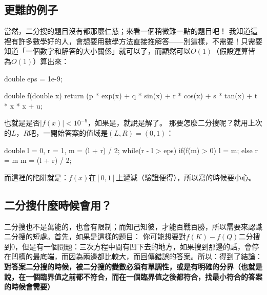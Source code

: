 	\subsection{更難的例子}
		當然，二分搜的題目沒有都那麼仁慈；來看一個稍微難一點的題目吧！
		我知道這裡有許多數學好的人，會想要用數學方法直接推解答——別這樣，不需要！只需要知道「一個數字和解答的大小關係」就可以了，而顯然可以$O(1)$（假設運算皆為$O(1)$）算出來：
		\begin{C++}
double eps = 1e-9;

double f(double x){
	return (p * exp(x) + q * sin(x) + r * cos(x) + s * tan(x) + t * x * x + u;	
}
		\end{C++}
		也就是是否$|f(x)| < 10^{-9}$，如果是，就說是解了。
		那要怎麼二分搜呢？就用上次的$L$，$R$吧，一開始答案的值域是$(L, R) = (0, 1)$：
		\begin{C++}
double l = 0, r = 1, m = (l + r) / 2;
while(r - l > eps){
	if(f(m) > 0){
		l = m;	
	} else {
		r = m
	}
	m = (l + r) / 2;
}
		\end{C++}
		而這裡的陷阱就是：$f(x)$在$[0, 1]$上遞減（驗證便得），所以寫的時候要小心。
	\subsection{二分搜什麼時候會用？}
		二分搜也不是萬能的，也會有限制；而知己知彼，才能百戰百勝，所以需要來認識二分搜的短處。首先，如果是這樣的題目：
		你可能想要對$f(K) - f(Q)$二分搜到$0$，但是有一個問題：三次方程中間有凹下去的地方，如果搜到那邊的話，會停在凹槽的最底端，而因為兩邊都比較大，而回傳錯誤的答案。所以：得到了結論：\textbf{對答案二分搜的時候，被二分搜的變數必須有單調性，或是有明確的分界（也就是說，在一個臨界值之前都不符合，而在一個臨界值之後都符合，找最小符合的答案的時候會需要）}
